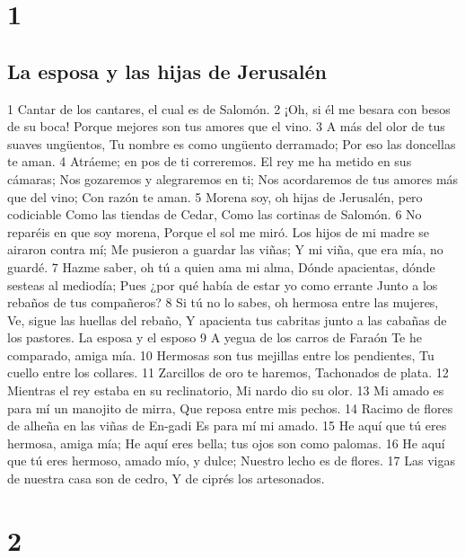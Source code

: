 
\chapter{1}

\section*{La esposa y las hijas de Jerusalén}

1 Cantar de los cantares, el cual es de Salomón. 
2 ¡Oh, si él me besara con besos de su boca!
Porque mejores son tus amores que el vino.
3 A más del olor de tus suaves ungüentos,
Tu nombre es como ungüento derramado;
Por eso las doncellas te aman.
4 Atráeme; en pos de ti correremos.
El rey me ha metido en sus cámaras;
Nos gozaremos y alegraremos en ti;
Nos acordaremos de tus amores más que del vino;
Con razón te aman.
5 Morena soy, oh hijas de Jerusalén, pero codiciable
Como las tiendas de Cedar,
Como las cortinas de Salomón.
6 No reparéis en que soy morena,
Porque el sol me miró.
Los hijos de mi madre se airaron contra mí;
Me pusieron a guardar las viñas;
Y mi viña, que era mía, no guardé.
7 Hazme saber, oh tú a quien ama mi alma,
Dónde apacientas, dónde sesteas al mediodía;
Pues ¿por qué había de estar yo como errante
Junto a los rebaños de tus compañeros?
8 Si tú no lo sabes, oh hermosa entre las mujeres,
Ve, sigue las huellas del rebaño,
Y apacienta tus cabritas junto a las cabañas de los pastores. 
La esposa y el esposo
9 A yegua de los carros de Faraón
Te he comparado, amiga mía.
10 Hermosas son tus mejillas entre los pendientes,
Tu cuello entre los collares.
11 Zarcillos de oro te haremos,
Tachonados de plata.
12 Mientras el rey estaba en su reclinatorio,
Mi nardo dio su olor.
13 Mi amado es para mí un manojito de mirra,
Que reposa entre mis pechos.
14 Racimo de flores de alheña en las viñas de En-gadi
Es para mí mi amado.
15 He aquí que tú eres hermosa, amiga mía; 
He aquí eres bella; tus ojos son como palomas.
16 He aquí que tú eres hermoso, amado mío, y dulce;
Nuestro lecho es de flores.
17 Las vigas de nuestra casa son de cedro,
Y de ciprés los artesonados.

\chapter{2}

